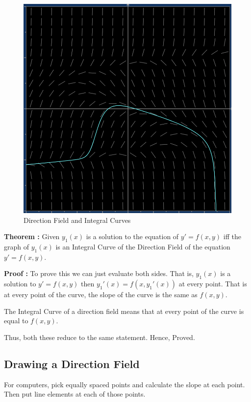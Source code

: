 \begin{figure}[ht!]
	\centering
	\includegraphics[scale=0.5]{./images/lecture_1_figure_1.png}
	\caption{Direction Field and Integral Curves}
\end{figure}

{\bf Theorem : } Given $y_1(x)$ is a solution to the equation of $y' = f(x, y)$
iff the graph of $y_1(x)$ is an Integral Curve of the Direction Field of the equation $y' = f(x, y)$.

{\bf Proof : }
To prove this we can just evaluate both sides. That is, $y_1(x)$ is a solution to $y' = f(x, y)$
then $y_1'(x) = f(x, y_1'(x))$ at every point.
That is at every point of the curve, the slope of the curve is the same as $f(x, y)$.

The Integral Curve of a direction field means that at every point of the curve is equal to $f(x, y)$.

Thus, both these reduce to the same statement. Hence, Proved.

\subsection{Drawing a Direction Field}

For computers, pick equally spaced points and calculate the slope at each point.
Then put line elements at each of those points.

